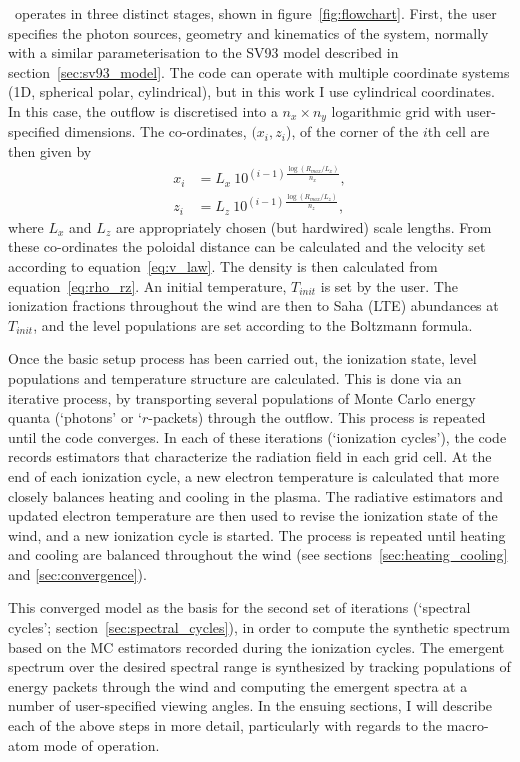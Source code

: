 \py\ operates in three distinct stages, shown in figure~\ref{fig:flowchart}. 
First, the user specifies the photon sources,
geometry and kinematics of the system, normally with a similar parameterisation
to the SV93 model described in section~\ref{sec:sv93_model}. 
The code can operate with multiple coordinate systems 
(1D, spherical polar, cylindrical), but in this work I use cylindrical coordinates.
In this case, the outflow is discretised into a $n_x \times n_y$ logarithmic grid with 
user-specified dimensions. The co-ordinates, $(x_i, z_i$), 
of the corner of the $i$th cell are then given by
\begin{align}
x_i &= L_{x}~10^{(i-1)\frac{\log (R_{max} / L_{x})}{n_x}},\\
z_i &= L_{z}~10^{(i-1)\frac{\log (R_{max} / L_{z})}{n_z}},
\end{align}
where $L_x$ and $L_z$ are appropriately chosen (but hardwired) scale lengths.
From these co-ordinates the poloidal distance can be calculated and
the velocity set according to equation~\ref{eq:v_law}. The density
is then calculated from equation~\ref{eq:rho_rz}. An initial temperature,
$T_{init}$ is set by the user. The ionization fractions throughout
the wind are then to Saha (LTE) abundances at $T_{init}$, and the level 
populations are set according to the Boltzmann formula.

Once the basic setup process has been carried out, the ionization state,
level populations and temperature structure are calculated.
This is done via an iterative process, by transporting several populations of 
Monte Carlo energy quanta (`photons' or `$r$-packets) through the outflow.
This process is repeated until the code converges. 
In each of these iterations (`ionization cycles'), the code records estimators that 
characterize the radiation field in each grid cell. At the end 
of each ionization cycle, a new electron temperature is calculated
that more closely balances heating and cooling in the 
plasma. The radiative estimators and updated electron
temperature are then used to revise the ionization state of the wind,
and a new ionization cycle is started. The process is repeated until
heating and cooling are balanced throughout the wind (see sections~\ref{sec:heating_cooling}
and \ref{sec:convergence}). 

This converged model as the basis for the second set of
iterations (`spectral cycles'; section~\ref{sec:spectral_cycles}), 
in order to compute the synthetic spectrum based on the 
MC estimators recorded during the ionization cycles. 
The emergent spectrum over the desired spectral range is synthesized by 
tracking populations of energy packets through the wind and computing the emergent spectra at
a number of user-specified viewing angles.  In the ensuing sections,
I will describe each of the above steps in more detail, particularly
with regards to the macro-atom mode of operation.


